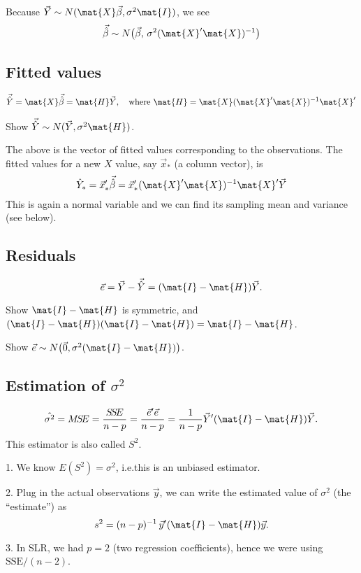 \documentclass[12pt]{article}
\begin{document}
Because
$\vec{Y} \sim N(\mat{X}\vec{\beta}, \sigma^2\mat{I})$,
we see
\[
\vec{\hat\beta}
\sim N\bigl(
    \vec{\beta},\,
    \sigma^2 (\mat{X}'\mat{X})^{-1}
    \bigr)
\]

\subsection{Fitted values}

\[
\vec{\hat{Y}} = \mat{X}\vec{\hat\beta} = \mat{H}\vec{Y},\quad
\text{where }
\mat{H} = \mat{X}(\mat{X}'\mat{X})^{-1}\mat{X}'
\]

\exercise
Show $\vec{\hat{Y}} \sim N(\vec{Y}, \sigma^2\mat{H})$.

The above is the vector of fitted values corresponding to the
observations.
The fitted values for a new $X$ value,
say $\vec{x}_*$ (a column vector), is
\[
\hat{Y}_*
= \vec{x}_*' \vec{\hat\beta}
= \vec{x}_*' (\mat{X}'\mat{X})^{-1}\mat{X}' \vec{Y}
\]
This is again a normal variable and we can find its
sampling mean and variance (see below).

\subsection{Residuals}

\[
\vec{e} = \vec{Y} - \vec{\hat{Y}} = (\mat{I} - \mat{H})\vec{Y}.
\]


\exercise
Show $\mat{I} - \mat{H}$ is symmetric,
and $(\mat{I} - \mat{H})(\mat{I} - \mat{H}) = \mat{I} - \mat{H}$.

\exercise
Show
$\vec{e} \sim N\bigl(\vec{0}, \sigma^2(\mat{I} - \mat{H})\bigr)$.

\subsection{Estimation of $\sigma^2$}

\[
\hat{\sigma^2}
= M\!S\!E
= \frac{S\!S\!E}{n-p}
= \frac{\vec{e}'\vec{e}}{n-p}
= \frac{1}{n-p} \vec{Y}'(\mat{I} - \mat{H})\vec{Y}
.
\]
This estimator is also called $S^2$.

\alert
1. We know $E(S^2) = \sigma^2$,
i.e.\@ this is an unbiased estimator.

2. Plug in the actual observations $\vec{y}$, we can write the estimated
value of $\sigma^2$ (the ``estimate'') as
\[
s^2 = (n-p)^{-1}\, \vec{y}'(\mat{I} - \mat{H})\vec{y}
.
\]

3. In SLR, we had $p = 2$ (two regression coefficients),
hence we were using $\text{SSE} / (n-2)$.
\end{document}

